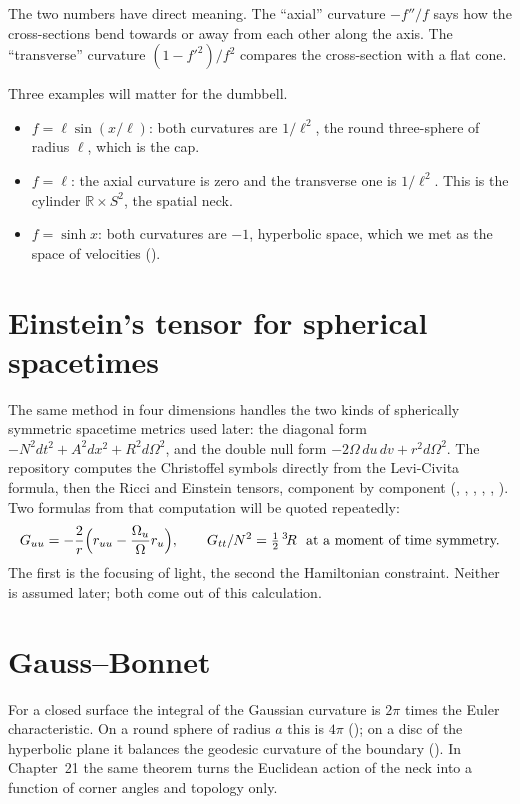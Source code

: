 The two numbers have direct meaning. The ``axial'' curvature $-f''/f$ says how the cross-sections bend towards or away from each other along the axis. The ``transverse'' curvature $(1-f'^2)/f^2$ compares the cross-section with a flat cone.

Three examples will matter for the dumbbell.
\begin{itemize}[leftmargin=*]
\item $f=\ell\sin(x/\ell)$: both curvatures are $1/\ell^2$, the round three-sphere of radius $\ell$, which is the cap.
\item $f=\ell$: the axial curvature is zero and the transverse one is $1/\ell^2$. This is the cylinder $\mathbb R\times S^2$, the spatial neck.
\item $f=\sinh x$: both curvatures are $-1$, hyperbolic space, which we met as the space of velocities ().
\end{itemize}

\section{Einstein's tensor for spherical spacetimes}

The same method in four dimensions handles the two kinds of spherically symmetric spacetime metrics used later: the diagonal form $-N^2dt^2+A^2dx^2+R^2d\Omega^2$, and the double null form $-2\Omega\,du\,dv+r^2d\Omega^2$. The repository computes the Christoffel symbols directly from the Levi-Civita formula, then the Ricci and Einstein tensors, component by component (, , , , , ). Two formulas from that computation will be quoted repeatedly:
\[
G_{uu}=-\frac2r\Bigl(r_{uu}-\frac{\Omega_u}{\Omega}r_u\Bigr),\qquad G_{tt}/N^2=\tfrac12\,{}^3\!R\ \text{ at a moment of time symmetry.}
\]
The first is the focusing of light, the second the Hamiltonian constraint. Neither is assumed later; both come out of this calculation.

\section{Gauss--Bonnet}

For a closed surface the integral of the Gaussian curvature is $2\pi$ times the Euler characteristic. On a round sphere of radius $a$ this is $4\pi$ (); on a disc of the hyperbolic plane it balances the geodesic curvature of the boundary (). In Chapter~21 the same theorem turns the Euclidean action of the neck into a function of corner angles and topology only.

